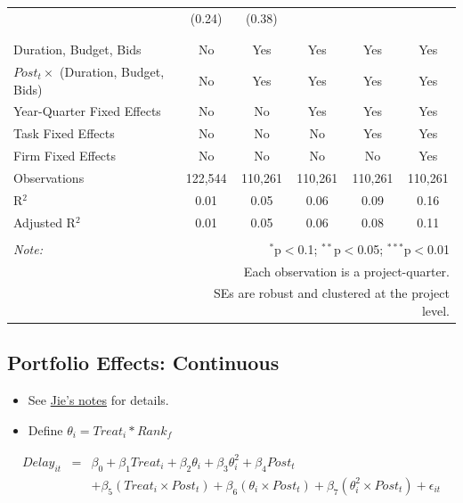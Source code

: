 \documentclass[
]{article}
\providecommand{\tightlist}{%
  \setlength{\itemsep}{0pt}\setlength{\parskip}{0pt}}
\begin{document}
\begin{table}[H]
\begin{tabular}{@{\extracolsep{-2pt}}lccccc}
  & (0.24) & (0.38) &  &  &  \\ 
  & & & & & \\ 
\hline \\[-1.8ex] 
Duration, Budget, Bids & No & Yes & Yes & Yes & Yes \\ 
$Post_t \times$  (Duration, Budget, Bids) & No & Yes & Yes & Yes & Yes \\ 
Year-Quarter Fixed Effects & No & No & Yes & Yes & Yes \\ 
Task Fixed Effects & No & No & No & Yes & Yes \\ 
Firm Fixed Effects & No & No & No & No & Yes \\ 
Observations & 122,544 & 110,261 & 110,261 & 110,261 & 110,261 \\ 
R$^{2}$ & 0.01 & 0.05 & 0.06 & 0.09 & 0.16 \\ 
Adjusted R$^{2}$ & 0.01 & 0.05 & 0.06 & 0.08 & 0.11 \\ 
\hline 
\hline \\[-1.8ex] 
\textit{Note:}  & \multicolumn{5}{r}{$^{*}$p$<$0.1; $^{**}$p$<$0.05; $^{***}$p$<$0.01} \\ 
 & \multicolumn{5}{r}{Each observation is a project-quarter.} \\ 
 & \multicolumn{5}{r}{SEs are robust and clustered at the project level.} \\ 
\end{tabular} 
\end{table}

\hypertarget{portfolio-effects-continuous}{%
\subsection{Portfolio Effects:
Continuous}\label{portfolio-effects-continuous}}

\begin{itemize}
\tightlist
\item
  See
  \href{https://github.com/QuickPay-Operational-Performance/Data-and-code/blob/master/notes/Portfolio\%20model\%2B0308.pdf}{Jie's
  notes} for details.
\item
  Define \(\theta_i = Treat_i*Rank_f\)
\end{itemize}

\[ \begin{aligned} Delay_{it} &=& \beta_0+\beta_1 Treat_i + \beta_2 \theta_i+\beta_3 \theta_i^2+\beta_4 Post_t\\&& + \beta_5 (Treat_i\times Post_t) + \beta_6 (\theta_i\times Post_t) +\beta_7 (\theta_i^2\times Post_t)+\epsilon_{it} \end{aligned} \]
\end{document}
